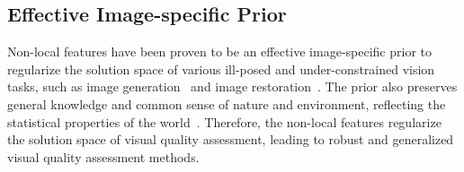 	\subsection{Effective Image-specific Prior}\label{Effective Image-specific Prior}
	Non-local features have been proven to be an effective image-specific prior to regularize the solution space of various ill-posed and under-constrained vision tasks, such as image generation~\citep{zhang2019self} and image restoration~\citep{buades2011non}. The prior also preserves general knowledge and common sense of nature and environment, reflecting the statistical properties of the world~\citep{girshick2011cardinal, ulyanov2018deep}. Therefore, the non-local features regularize the solution space of visual quality assessment, leading to robust and generalized visual quality assessment methods.